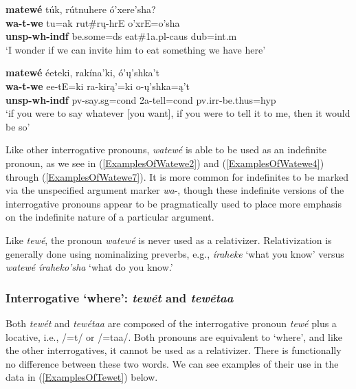 \begin{exe}
\begin{xlist}
\item\label{ExamplesOfWatewe6} \glll \textbf{matewé} túk, rútnuhere ó'xere'sha?\\
    \textbf{wa-t-we} tu=ak rut\#rų-hrE o'xrE=o'sha\\
    \textbf{unsp-wh-indf} \textnormal{be.some}=ds \textnormal{eat}\#1a.pl-caus dub=int.m\\
    \glt `I wonder if we can invite him to eat something we have here' \citep[127]{hollow1973a}

\item\label{ExamplesOfWatewe7} \glll \textbf{matewé} éeteki, rakína'ki, ó'ų'shka't\\
    \textbf{wa-t-we} ee-tE=ki ra-kirą'=ki o-ų'shka=ą't\\
    \textbf{unsp-wh-indf} pv-\textnormal{say}.sg=cond 2a-\textnormal{tell}=cond pv.irr-\textnormal{be.thus}=hyp\\
    \glt `if you were to say whatever [you want], if you were to tell it to me, then it would be so' \citep[241]{hollow1973b}

\end{xlist}

\end{exe}

Like other interrogative pronouns, \textit{watewé} is able to be used as an indefinite pronoun, as we see in (\ref{ExamplesOfWatewe2}) and (\ref{ExamplesOfWatewe4}) through (\ref{ExamplesOfWatewe7}). It is more common for indefinites to be marked via the unspecified argument marker \textit{wa}-, though these indefinite versions of the interrogative pronouns appear to be pragmatically used to place more emphasis on the indefinite nature of a particular argument.

Like \textit{tewé}, the pronoun \textit{watewé} is never used as a relativizer. Relativization is generally done using nominalizing preverbs, e.g., \textit{íraheke} `what you know' versus \textit{watewé íraheko'sha} `what do you know.'

\subsubsection{Interrogative `where': \textit{tewét} and \textit{tewétaa}}\label{SubSubSectionTewet}

Both \textit{tewét} and \textit{tewétaa} are composed of the interrogative pronoun \textit{tewé} plus a locative, i.e., /=t/ or /=taa/. Both pronouns are equivalent to `where', and like the other interrogatives, it cannot be used as a relativizer. There is functionally no difference between these two words. We can see examples of their use in the data in (\ref{ExamplesOfTewet}) below.

